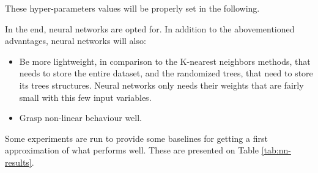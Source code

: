 These hyper-parameters values will be properly set in the following.

In the end, neural networks are opted for. In addition to the abovementioned advantages, neural networks will also:
\begin{itemize}
    \item Be more lightweight, in comparison to the K-nearest neighbors methods, that needs to store the entire dataset, and the randomized trees, that need to store its trees structures. Neural networks only needs their weights that are fairly small with this few input variables.
    \item Grasp non-linear behaviour well.
\end{itemize}

Some experiments are run to provide some baselines for getting a first approximation of what performs well. These are presented on Table \ref{tab:nn-results}.

